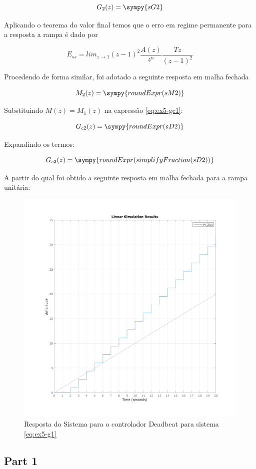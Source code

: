 \documentclass[a4paper,11pt]{article}
\begin{document}
\begin{equation}\label{eq:ex5-g2}
    G_2(z) = \sympy{sG2}
\end{equation}

Aplicando o teorema do valor final temos que o erro em regime permanente para a resposta a rampa é dado por

$$E_{ss} = lim_{z \rightarrow 1}(z - 1)^2\frac{A(z)}{z^n}\frac{T z}{(z-1)^2}$$

Procedendo de forma similar, foi adotado a seguinte resposta em malha fechada

$$M_2(z) = \sympy{roundExpr(sM2)}$$

Substituindo $M(z) = M_1(z)$ na expressão \ref{eq:ex5-gc1}:

$$G_{c2}(z) = \sympy{roundExpr(sD2)}$$

Expandindo os termos:

$$G_{c2}(z) = \sympy{roundExpr(simplifyFraction(sD2))}$$

A partir do qual foi obtido a seguinte resposta em malha fechada para a rampa unitária:

\begin{figure}[H]
    \centering
    \includegraphics[width=0.6\linewidth]{img/exsim5-g2-deadbeat-sim.png}
    \caption{Resposta do Sistema para o controlador Deadbeat para sistema \ref{eq:ex5-g1}}
\end{figure}

\subsection{Part 1}
\end{document}
